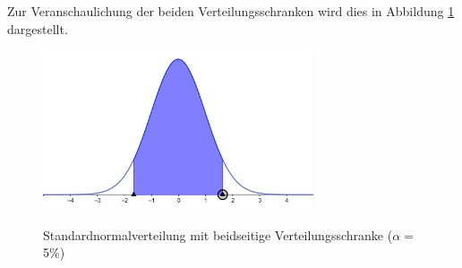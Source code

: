 \newpage
 Zur Veranschaulichung der beiden Verteilungsschranken wird dies in Abbildung \ref{fig:Standardnormalverteilung} dargestellt.
\begin{figure}[h]
  \caption{Standardnormalverteilung mit beidseitige Verteilungsschranke ($\alpha=$ 5\%)}
  \label{fig:Standardnormalverteilung}
  \includegraphics[width=8cm]{Bilder/geogebra-export.png}
  \centering
  \cite{graph_normalverteilung}
\end{figure}

